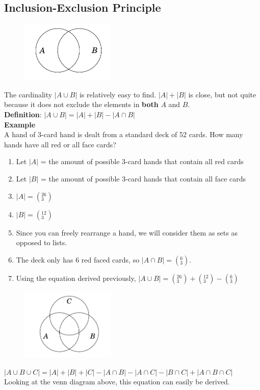 \documentclass[a4paper,11pt]{article}
\begin{document}
\subsection{Inclusion-Exclusion Principle}
\begin{figure}[h]
 \centering
 \includegraphics[width=0.40\textwidth]{venn.png}
\end{figure}
The cardinality $|A \cup B|$ is relatively easy to find. $|A|+|B|$ is close, but not quite because it does not exclude the elements in \textbf{both} $A$ and $B$.\\
\textbf{Definition}: $|A \cup B|=|A|+|B|- |A \cap B|$\vspace{5pt}\\
\textbf{Example}\\
A hand of 3-card hand is dealt from a standard deck of 52 cards. How many hands have all red or all face cards?
\begin{enumerate}
 \item Let $|A|$ = the amount of possible 3-card hands that contain all red cards
 \item Let $|B|$ = the amount of possible 3-card hands that contain all face cards
 \item $|A|=(^{26}_3)$
 \item $|B|=(^{12}_3)$
 \item Since you can freely rearrange a hand, we will consider them as sets as opposed to lists.
 \item The deck only has 6 red faced cards, so $|A \cap B|=(^{6}_3)$.
 \item Using the equation derived previously, $|A \cup B|=(^{26}_3) + (^{12}_3) - (^{6}_3)$
\end{enumerate}
\begin{figure}[h]
 \centering
 \includegraphics[width=0.40\textwidth]{trivenn.png}
\end{figure}
$|A \cup B \cup C|=|A|+|B|+|C|-|A \cap B|-|A \cap C| - |B \cap C| + |A \cap B \cap C|$\\
Looking at the venn diagram above, this equation can easily be derived.
\end{document}
